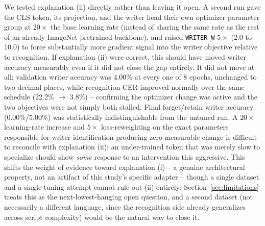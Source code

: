 \documentclass[a4paper,fleqn]{cas-dc}
\begin{document}
We tested explanation (ii) directly rather than leaving it open. A second
run gave the CLS token, its projection, and the writer head their own
optimizer parameter group at $20\times$ the base learning rate (instead of
sharing the same rate as the rest of an already ImageNet-pretrained
backbone), and raised \texttt{WRITER\_W} $5\times$ (2.0 to 10.0) to force
substantially more gradient signal into the writer objective relative to
recognition. If explanation (ii) were correct, this should have moved
writer accuracy measurably even if it did not close the gap entirely. It
did not move at all: validation writer accuracy was 4.00\% at every one of
8 epochs, unchanged to two decimal places, while recognition CER improved
normally over the same schedule (22.2\% $\to$ 3.8\%) -- confirming the
optimizer change was active and the two objectives were not simply both
stalled. Final forget/retain writer accuracy (0.00\%/5.00\%) was
statistically indistinguishable from the untuned run. A $20\times$
learning-rate increase and $5\times$ loss-reweighting on the exact
parameters responsible for writer identification producing zero
measurable change is difficult to reconcile with explanation (ii): an
under-trained token that was merely slow to specialize should show
\emph{some} response to an intervention this aggressive. This shifts the
weight of evidence toward explanation (i) -- a genuine architectural
property, not an artifact of this study's specific adapter -- though a
single dataset and a single tuning attempt cannot rule out (ii) entirely;
Section~\ref{sec:limitations} treats this as the next-lowest-hanging
open question, and a second dataset (not necessarily a different
language, since the recognition side already generalizes across script
complexity) would be the natural way to close it.
\end{document}
